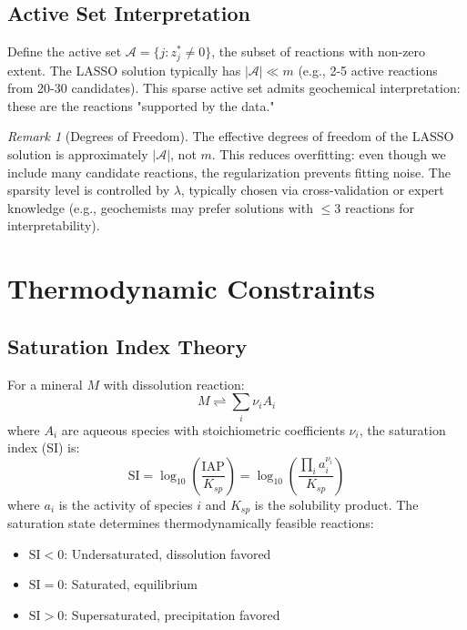 \documentclass[12pt,a4paper]{article}
\theoremstyle{plain}
\theoremstyle{definition}
\theoremstyle{remark}
\newtheorem{remark}[theorem]{Remark}
\begin{document}
\subsection{Active Set Interpretation}

Define the active set $\mathcal{A} = \{j : z_j^* \neq 0\}$, the subset of reactions with non-zero extent. The LASSO solution typically has $|\mathcal{A}| \ll m$ (e.g., 2-5 active reactions from 20-30 candidates). This sparse active set admits geochemical interpretation: these are the reactions "supported by the data."

\begin{remark}[Degrees of Freedom]
	The effective degrees of freedom of the LASSO solution is approximately $|\mathcal{A}|$, not $m$. This reduces overfitting: even though we include many candidate reactions, the regularization prevents fitting noise. The sparsity level is controlled by $\lambda$, typically chosen via cross-validation or expert knowledge (e.g., geochemists may prefer solutions with $\leq 3$ reactions for interpretability).
\end{remark}
\newpage
\section{Thermodynamic Constraints}\label{sec:thermo}

\subsection{Saturation Index Theory}

For a mineral $M$ with dissolution reaction:
\begin{equation}
	M \rightleftharpoons \sum_i \nu_i A_i
\end{equation}
where $A_i$ are aqueous species with stoichiometric coefficients $\nu_i$, the saturation index (SI) is:
\begin{equation}\label{eq:saturation_index}
	\text{SI} = \log_{10}\left(\frac{\text{IAP}}{K_{sp}}\right) = \log_{10}\left(\frac{\prod_i a_i^{\nu_i}}{K_{sp}}\right)
\end{equation}
where $a_i$ is the activity of species $i$ and $K_{sp}$ is the solubility product. The saturation state determines thermodynamically feasible reactions:

\begin{itemize}
	\item $\text{SI} < 0$: Undersaturated, dissolution favored
	\item $\text{SI} = 0$: Saturated, equilibrium
	\item $\text{SI} > 0$: Supersaturated, precipitation favored
\end{itemize}
\end{document}
